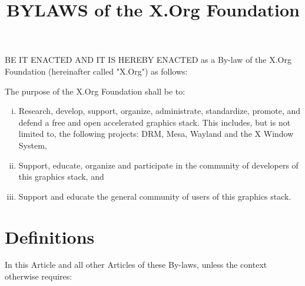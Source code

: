 \documentclass[10pt, english]{xorgdocs}
\begin{document}
\title{BYLAWS of the X.Org Foundation}
\immediate{}
\date{}
\maketitle

BE IT ENACTED AND IT IS HEREBY ENACTED as a By-law of the X.Org Foundation
(hereinafter called "X.Org") as follows:


The purpose of the X.Org Foundation shall be to:
\begin{enumerate}[(i)\hspace{.2cm}]
	\item Research, develop, support, organize, administrate, standardize,
	promote, and defend a free and open accelerated graphics stack. This
	includes, but is not limited to, the following projects: DRM, Mesa,
	Wayland and the X Window System,

	\item Support, educate, organize and participate in the community of
	developers of this graphics stack, and

	\item Support and educate the general community of users of this
	graphics stack.
\end{enumerate}


\section{Definitions}
In this Article and all other Articles of these By-laws, unless the context
otherwise requires:
\end{document}
